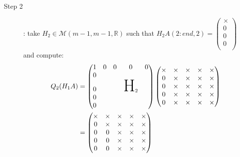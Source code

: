 \documentclass[ComputationalMathematics.tex]{subfiles}
\begin{document}
\begin{example}
\begin{description}
  \item[{\sc Step 2}]: take $H_{2} \in \mathcal{M}(m-1, m-1, \mathds{R})$ such that $H_{2}A(2:end, 2) = \begin{pmatrix} \times\\ 0\\ 0\\ 0\\ \end{pmatrix}$ and compute:
    \begin{equation}
      \begin{aligned}
        Q_2 (H_1 A)
        &= 
        \begin{pmatrix}
          1 & 0 & 0 & 0 & 0\\
          0 & & &\\
          0 && & \text{\Huge H}_2\\
          0 &&& \\
          0 &&&\\
        \end{pmatrix} 
        \begin{pmatrix}
          \times & \times & \times & \times & \times\\
          0 & \times & \times & \times & \times\\
          0 & \times & \times & \times & \times\\
          0 & \times & \times & \times & \times\\
          0 & \times & \times & \times & \times\\
        \end{pmatrix}\\
        &= \begin{pmatrix}
          \times & \times & \times & \times & \times\\
          0 & \times & \times & \times & \times\\
          0 & 0 & \times & \times & \times\\
          0 & 0 & \times & \times & \times\\
          0 & 0 & \times & \times & \times\\
        \end{pmatrix}
      \end{aligned}
    \end{equation}
    

\end{description}
\end{example}
\end{document}
